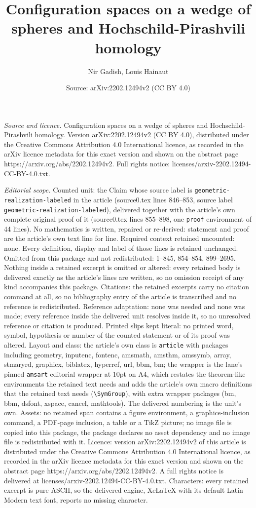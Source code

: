 \documentclass[10pt,a4paper]{amsart}
\title[Configuration spaces on a wedge of spheres and Hochschild-Pi]{Configuration spaces on a wedge of spheres and Hochschild-Pirashvili homology}
\author{Nir Gadish, Louis Hainaut}
\date{Source: arXiv:2202.12494v2 (CC BY 4.0)}
\begin{document}
\maketitle

\noindent\emph{Source and licence.} Configuration spaces on a wedge of spheres and Hochschild-Pirashvili homology. Version arXiv:2202.12494v2 (CC BY 4.0), distributed under the Creative Commons Attribution 4.0 International licence, as recorded in the arXiv licence metadata for this exact version and shown on the abstract page https://arxiv.org/abs/2202.12494v2. Full rights notice: licenses/arxiv-2202.12494-CC-BY-4.0.txt.\par\smallskip

\noindent\textit{Editorial scope.} Counted unit: the Claim whose source label is \texttt{geometric-realization-labeled} in the article (source0.tex lines 846--853, source label \texttt{geometric-realization-labeled}), delivered together with the article's own complete original proof of it (source0.tex lines 855--898, one \texttt{proof} environment of 44 lines). No mathematics is written, repaired or re-derived: statement and proof are the article's own text line for line. Required context retained uncounted: none. Every definition, display and label of those lines is retained unchanged. Omitted from this package and not redistributed: 1--845, 854--854, 899--2695. Nothing inside a retained excerpt is omitted or altered: every retained body is delivered exactly as the article's lines are written, so no omission receipt of any kind accompanies this package. Citations: the retained excerpts carry no citation command at all, so no bibliography entry of the article is transcribed and no reference is redistributed. Reference adaptation: none was needed and none was made; every reference inside the delivered unit resolves inside it, so no unresolved reference or citation is produced. Printed slips kept literal: no printed word, symbol, hypothesis or number of the counted statement or of its proof was altered. Layout and class: the article's own class is \texttt{article} with packages including geometry, inputenc, fontenc, amsmath, amsthm, amssymb, array, stmaryrd, graphicx, biblatex, hyperref, url, bbm, bm; the wrapper is the lane's pinned \texttt{amsart} editorial wrapper at 10pt on A4, which restates the theorem-like environments the retained text needs and adds the article's own macro definitions that the retained text needs (\texttt{\textbackslash SymGroup}), with extra wrapper packages (bm, bbm, dsfont, xspace, cancel, mathtools). The delivered numbering is the unit's own. Assets: no retained span contains a figure environment, a graphics-inclusion command, a PDF-page inclusion, a table or a TikZ picture; no image file is copied into this package, the package declares no asset dependency and no image file is redistributed with it. Licence: version arXiv:2202.12494v2 of this article is distributed under the Creative Commons Attribution 4.0 International licence, as recorded in the arXiv licence metadata for this exact version and shown on the abstract page https://arxiv.org/abs/2202.12494v2. A full rights notice is delivered at licenses/arxiv-2202.12494-CC-BY-4.0.txt. Characters: every retained excerpt is pure ASCII, so the delivered engine, XeLaTeX with its default Latin Modern text font, reports no missing character.
\end{document}
